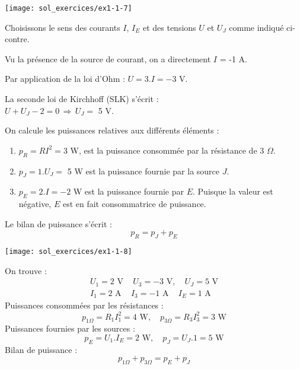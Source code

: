 
\begin{minipage}[c]{5cm}
	\begin{center}
		\texttt{[image: sol\_exercices/ex1-1-7]}
	\end{center}
\end{minipage}
\begin{minipage}[c]{5cm}
	Choisissons le sens des courants $I$, $I_E$ et des  tensions $U$ et $U_J$
	comme indiqué ci-contre.
	
	Vu la présence de la source de courant, on a directement $I$ = -1 A.
	
	Par application de la loi d'Ohm : $U=3.I=-3$ V.
	
	La seconde loi de Kirchhoff (SLK) s'écrit : \\$U+U_J-2=0 \, \Rightarrow\,
	U_J=$ 5 V.
\end{minipage}
On calcule les puissances relatives aux différents éléments :
\begin{enumerate}
	\item $p_R=RI^2= 3$ W, est la puissance consommée par la résistance de
	$3\,\, \Omega$.
	\item $p_J=1.U_J=$ 5 W est la puissance fournie par la source $J$.
	\item $p_E=2.I=-2$ W est la puissance fournie par $E$. Puisque la
	valeur est négative, $E$ est en fait consommatrice de puissance.
\end{enumerate}
Le bilan de puissance s'écrit :
\[p_R=p_J+p_E\]



\begin{center}
	\texttt{[image: sol\_exercices/ex1-1-8]}
\end{center}
On trouve :
\begin{gather*}
U_1=2\,\, \text{V}\, \quad U_3=-3\,\,\text{V},\quad
U_J=5\,\,\text{V}\\
I_1=2\,\, \text{A}\, \quad I_3=-1\,\, \text{A}\, \quad
I_E=1\,\,\text{A}
\end{gather*}
Puissances consommées par les résistances :
\[p_{1\Omega}=R_1I_1^2=4\,\, \text{W},\quad p_{3\Omega}=R_3I_3^2=3\,\,
\text{W}\]
Puissances fournies par les sources :
\[p_E=U_1.I_E=2 \,\, \text{W},\quad p_J=U_J.1=5\,\, \text{W}\]
Bilan de puissance :
\[p_{1\Omega}+p_{3\Omega}=p_E+p_J\]

